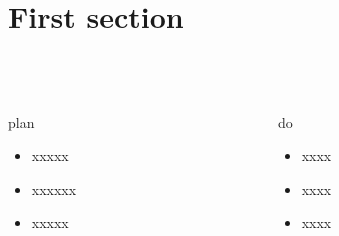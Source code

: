\usetikzlibrary{arrows,shapes,chains}
\section{First section}
\frame
{
  \frametitle{\secname~ }
  \begin{columns}[onlytextwidth]
  \begin{column}{0.35\textwidth}
  \begin{block}{plan}
  \begin{itemize}
    \item xxxxx
    \item xxxxxx
    \item xxxxx
  \end{itemize}
  \end{block}
  \end{column}
  \hspace{0.5em}
  \begin{column}{0.65\textwidth}
    \begin{block}{do}
      \begin{itemize}
        \item xxxx
        \item xxxx
        \item xxxx
      \end{itemize}
    \end{block}
  \end{column}
  \end{columns}
}

